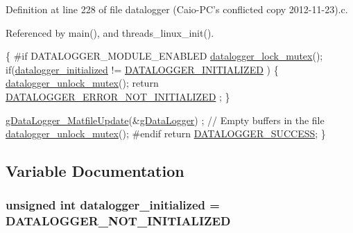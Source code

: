 Definition at line 228 of file datalogger (\-Caio-\/\-P\-C's conflicted copy 2012-\/11-\/23).\-c.



Referenced by main(), and threads\-\_\-linux\-\_\-init().


\begin{DoxyCode}
\{
\textcolor{preprocessor}{    #if DATALOGGER\_MODULE\_ENABLED}
\textcolor{preprocessor}{}    \hyperlink{datalogger_01_07Caio-PC's_01conflicted_01copy_012012-11-23_08_8c_a54b06d9395b2e370a5a72beb7f9524b2}{datalogger\_lock\_mutex}();
    \textcolor{keywordflow}{if}(\hyperlink{datalogger_01_07Caio-PC's_01conflicted_01copy_012012-11-23_08_8c_a35e8fbe04b90452afdc3c1be16ff6187}{datalogger\_initialized} != \hyperlink{datalogger_01_07Caio-PC's_01conflicted_01copy_012012-11-23_08_8h_a684c343d340004b77ca2b782934c96ca}{DATALOGGER\_INITIALIZED}
      )
    \{
        \hyperlink{datalogger_01_07Caio-PC's_01conflicted_01copy_012012-11-23_08_8c_a85453211c0c809083c36cc56b275aeeb}{datalogger\_unlock\_mutex}();
        \textcolor{keywordflow}{return} \hyperlink{datalogger_01_07Caio-PC's_01conflicted_01copy_012012-11-23_08_8h_a60df7fe0e61b757ad6a9db106b0eb43e}{DATALOGGER\_ERROR\_NOT\_INITIALIZED}
      ;
    \}

    \hyperlink{gdatalogger_8c_a05dc8ce832b941280d7de26057992640}{gDataLogger\_MatfileUpdate}(&\hyperlink{datalogger_01_07Caio-PC's_01conflicted_01copy_012012-11-23_08_8c_abe3b9c2c4e21e79c7b046b5986d13acc}{gDataLogger})
      ; \textcolor{comment}{// Empty buffers in the file}
    \hyperlink{datalogger_01_07Caio-PC's_01conflicted_01copy_012012-11-23_08_8c_a85453211c0c809083c36cc56b275aeeb}{datalogger\_unlock\_mutex}();
\textcolor{preprocessor}{    #endif}
\textcolor{preprocessor}{}
    \textcolor{keywordflow}{return} \hyperlink{datalogger_01_07Caio-PC's_01conflicted_01copy_012012-11-23_08_8h_abddebaf71d26d40183fccbb1a766b983}{DATALOGGER\_SUCCESS};
\}
\end{DoxyCode}


\subsection{Variable Documentation}
\hypertarget{datalogger_01_07Caio-PC's_01conflicted_01copy_012012-11-23_08_8c_a35e8fbe04b90452afdc3c1be16ff6187}{
\subsubsection[{datalogger\-\_\-initialized}]{\setlength{\rightskip}{0pt plus 5cm}unsigned int datalogger\-\_\-initialized = {\bf D\-A\-T\-A\-L\-O\-G\-G\-E\-R\-\_\-\-N\-O\-T\-\_\-\-I\-N\-I\-T\-I\-A\-L\-I\-Z\-E\-D}}}\label{datalogger_01_07Caio-PC's_01conflicted_01copy_012012-11-23_08_8c_a35e8fbe04b90452afdc3c1be16ff6187}


